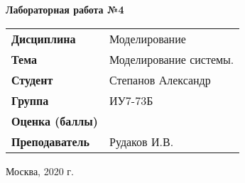 \begin{center}
    \textbf{Лабораторная работа №4} \\
    \vspace{0.5cm}
\end{center}

\vspace{4cm}

\begin{flushleft}
    \begin{tabular}{ll}
        \textbf{Дисциплина} & Моделирование \\
        \textbf{Тема} & Моделирование системы. \\
        \textbf{Студент} & Степанов Александр \\
        \textbf{Группа} & ИУ7-73Б \\
        \textbf{Оценка (баллы)} & \\
        \textbf{Преподаватель} & Рудаков И.В. \\
    \end{tabular}
\end{flushleft}

\vspace{4cm}

\begin{center}
    Москва, 2020 г.
\end{center}
